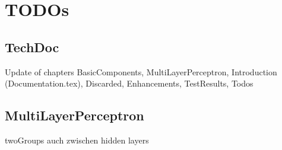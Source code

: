 \chapter{TODOs}
\section{TechDoc}
Update of chapters BasicComponents, MultiLayerPerceptron, Introduction (Documentation.tex), Discarded, Enhancements, TestResults, Todos

\section{MultiLayerPerceptron}
twoGroups auch zwischen hidden layers